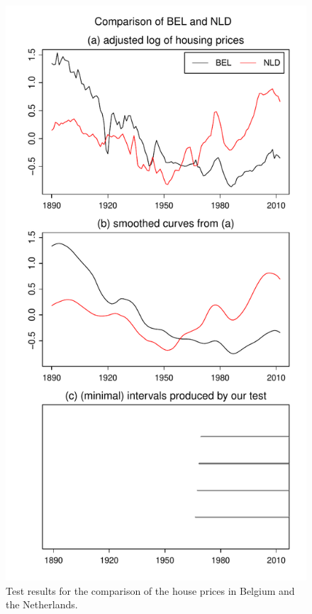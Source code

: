 \documentclass[12pt]{article}
\begin{document}
\begin{figure}
\hspace{0.1cm}
\begin{minipage}[t]{0.24\textwidth}
\includegraphics[width=\textwidth]{../output/plots/hp/BEL_vs_NLD}
\caption{Test results for the comparison of the house prices in Belgium and the Netherlands.}\label{fig:hp:Belgium:Netherlands}
\end{minipage}

\end{figure}
\end{document}
